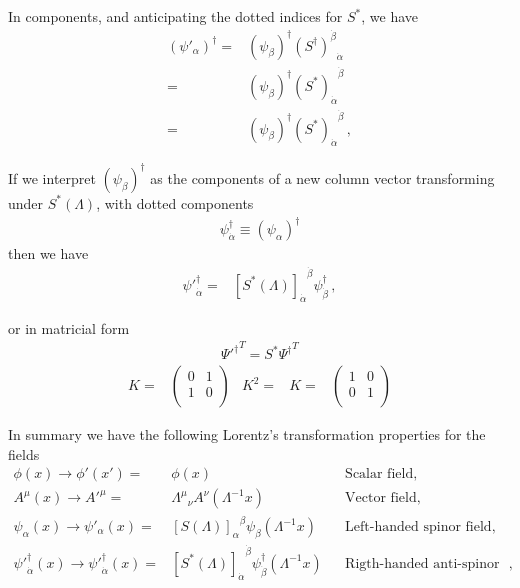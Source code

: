 In components, and anticipating the dotted indices for $S^{*}$, we have
\begin{align}
  \left( \psi'_\alpha \right)^{\dagger}=&\left( \psi_\beta \right)^{\dagger}{\left( S^\dagger\right)^{\dot{\beta}}}_{\dot{\alpha}}\nonumber\\
=&\left( \psi_\beta \right)^{\dagger}{\left( S^*\right)_{\dot{\alpha}}}^{\dot{\beta}}\nonumber\\
=&\left( \psi_\beta \right)^{\dagger}{\left( S^*\right)_{\dot{\alpha}}}^{\dot{\beta}}\,,
\end{align}
\begin{frame}
If we interpret $\left( \psi_\beta \right)^{\dagger}$ as the components of a new column vector transforming under $S^{*}(\Lambda)$, with dotted components
\begin{align}
 \psi_{\dot{\alpha}}^{\dagger}\equiv \left( \psi_\alpha \right)^{\dagger}
\end{align}
then we have
\begin{align}
  {\psi'}_{\dot{\alpha}}^{\dagger}=&{\left[ S^*(\Lambda)\right]_{\dot{\alpha}}}^{\dot{\beta}} \psi_{\dot{\beta}}^{\dagger}\,,
\end{align}
\end{frame}
or in matricial form
\begin{align}
{{\Psi'}^{\dagger}}^{T}=S^{*}{{\Psi}^{\dagger}}^{T}
\end{align}
\begin{align}
  K=&\begin{pmatrix}
    0 & 1\\
    1 & 0\\
  \end{pmatrix}& K^2=&  K=&\begin{pmatrix}
    1 & 0\\
    0 & 1\\
  \end{pmatrix}
\end{align}

\begin{frame}
In summary we have the following Lorentz's transformation properties for the fields
\begin{align}
   \phi(x)\to \phi'(x')=&\phi(x) && \text{Scalar field,}\nonumber\\
   A^\mu(x)\to {A'}^\mu=&{\Lambda^\mu}_\nu A^\nu(\Lambda^{-1}x)&&\text{Vector field,}\nonumber\\
  \psi_\alpha(x)\to\psi'_\alpha(x)=&{\left[ S(\Lambda) \right]_\alpha}^\beta\psi_\beta(\Lambda^{-1}x)
&& \text{Left-handed spinor field,}\nonumber\\
 {\psi'}_{\dot{\alpha}}^{\dagger}(x)\to  {\psi'}_{\dot{\alpha}}^{\dagger}(x)=&{\left[ S^*(\Lambda)\right]_{\dot{\alpha}}}^{\dot{\beta}} \psi_{\dot{\beta}}^{\dagger}(\Lambda^{-1}x)&& \text{Rigth-handed anti-spinor field,}\,,
 \end{align}
\end{frame}



